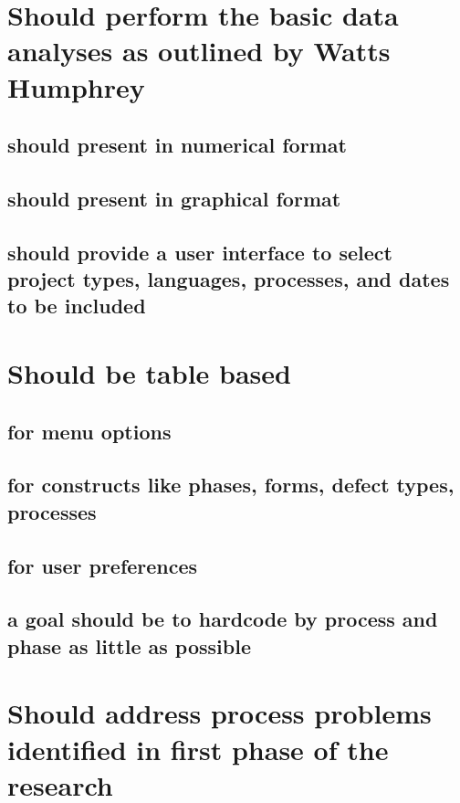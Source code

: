 \section{Should perform the basic data analyses as outlined by Watts
Humphrey}
\subsection{should present in numerical format}
\subsection{should present in graphical format}
\subsection{should provide a user interface to select project types,
languages, processes, and dates to be included}
\section{Should be table based}
\subsection{for menu options}
\subsection{for constructs like phases, forms, defect types, processes}
\subsection{for user preferences}
\subsection{a goal should be to hardcode by process and phase as little as
possible}
\section{Should address process problems identified in first phase of the research}
\newpage
\nocite{Humphrey95,Ceberio-Verghese96,Tomayko96,CMU95,Worsley96}





